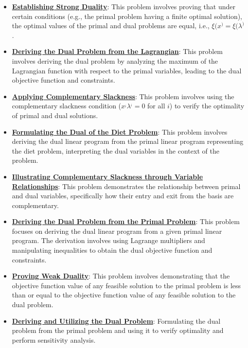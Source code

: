 \documentclass{article}%
\begin{document}
\begin{itemize}[leftmargin=*]
\item \href{https://www.math.purdue.edu/~yipn/421/2024-09-17-DualityGeneral.pdf#page=17}{\textbf{Establishing Strong Duality}}: This problem involves proving that under certain conditions (e.g., the primal problem having a finite optimal solution), the optimal values of the primal and dual problems are equal, i.e., $\xi(x^) = \xi(\lambda^)$.%
\item \href{https://www.math.purdue.edu/~yipn/421/2024-09-17-DualityGeneral.pdf#page=15}{\textbf{Deriving the Dual Problem from the Lagrangian}}: This problem involves deriving the dual problem by analyzing the maximum of the Lagrangian function with respect to the primal variables, leading to the dual objective function and constraints.%
\item \href{https://www.math.purdue.edu/~yipn/421/2024-09-17-DualityGeneral.pdf#page=22}{\textbf{Applying Complementary Slackness}}: This problem involves using the complementary slackness condition ($x^_i \lambda^_i = 0$ for all $i$) to verify the optimality of primal and dual solutions.%
\item \href{https://www.math.purdue.edu/~yipn/421/2024-09-19-DualityExamples.pdf#page=8}{\textbf{Formulating the Dual of the Diet Problem}}: This problem involves deriving the dual linear program from the primal linear program representing the diet problem, interpreting the dual variables in the context of the problem.%
\item \href{https://www.math.purdue.edu/~yipn/421/2024-09-24-SimplexMatrix.pdf#page=14}{\textbf{Illustrating Complementary Slackness through Variable Relationships}}: This problem demonstrates the relationship between primal and dual variables, specifically how their entry and exit from the basis are complementary.%
\item \href{https://www.math.purdue.edu/~yipn/421/2024-10-01-DualGeneralLP.pdf#page=1}{\textbf{Deriving the Dual Problem from the Primal Problem}}: This problem focuses on deriving the dual linear program from a given primal linear program. The derivation involves using Lagrange multipliers and manipulating inequalities to obtain the dual objective function and constraints.%
\item \href{https://www.math.purdue.edu/~yipn/421/2024-10-01-DualGeneralLP.pdf#page=5}{\textbf{Proving Weak Duality}}: This problem involves demonstrating that the objective function value of any feasible solution to the primal problem is less than or equal to the objective function value of any feasible solution to the dual problem.%
\item \href{https://www.math.purdue.edu/~yipn/421/2024-10-01-SensitivityDuality.pdf#page=2}{\textbf{Deriving and Utilizing the Dual Problem}}: Formulating the dual problem from the primal problem and using it to verify optimality and perform sensitivity analysis.%
\end{itemize}
\end{document}
